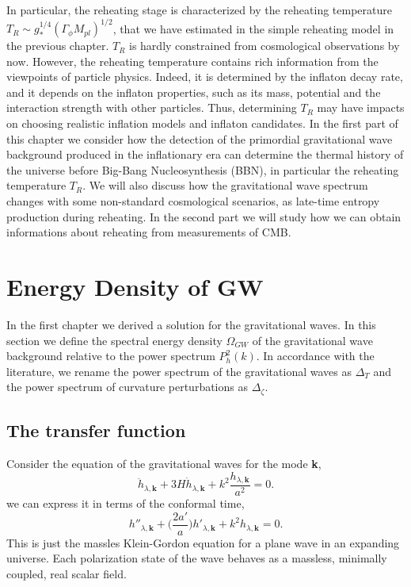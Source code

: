 \documentclass[11pt,a4paper,twoside]{book}
\begin{document}
In particular, the reheating stage is characterized by the reheating temperature $ T_{R} \sim g_{*}^{1/4}(\Gamma_{\phi}M_{pl})^{1/2} $, that we have estimated in the simple reheating model in the previous chapter. $ T_{R} $ is hardly constrained from cosmological observations by now. However, the reheating temperature contains rich information from the viewpoints of particle physics. Indeed, it is determined by the inflaton decay rate, and it depends on the inflaton properties, such as its mass, potential and the interaction strength with other particles. Thus, determining  $ T_{R} $ may have impacts on choosing realistic inflation models and inflaton candidates. In the first part of this chapter we consider how the detection of the primordial gravitational wave background produced in the inflationary era can determine the thermal history of the universe before Big-Bang Nucleosynthesis (BBN), in particular the reheating temperature $ T_{R} $. We will also discuss how the gravitational wave spectrum changes with some non-standard cosmological scenarios, as late-time entropy production during reheating.
In the second part we will study how we can obtain informations about reheating from measurements of CMB.
\section{Energy Density of GW}
In the first chapter we derived a solution for the gravitational waves. In this section we define the  spectral energy density $\Omega_{GW}$ of the gravitational wave background relative to the power spectrum $ P^{2}_{h}(k)$. In accordance with the literature, we rename the power spectrum of the gravitational waves as $ \Delta_{T} $ and the power spectrum of curvature perturbations as $\Delta_{\zeta}$.
\subsection{The transfer function}
Consider the equation of the gravitational waves for the mode \textbf{k},
\begin{equation}
	\ddot{h}_{\lambda,\textbf{k}} + 3H\dot{h}_{\lambda,\textbf{k}}+ k^{2}\frac{h_{\lambda,\textbf{k}}}{a^{2}}=0.
\end{equation}
we can express it in terms of the conformal time,
\begin{equation}
	\label{Chap3:equationGWConformalTime}
	h''_{\lambda,\textbf{k}} + \Big (\frac{2a'}{a}\Big)h'_{\lambda,\textbf{k}} + k^{2}h_{\lambda,\textbf{k}} = 0.
\end{equation}
This is just the massles Klein-Gordon equation for a plane wave in an expanding universe. Each polarization state of the wave behaves as a massless, minimally coupled, real scalar field. 
\end{document}
